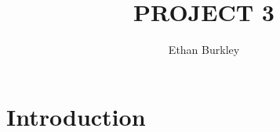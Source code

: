 \documentclass[12pt]{report}
\begin{document}
\title{PROJECT 3}
\author{Ethan Burkley}

\section{Introduction} 
\end{document}
